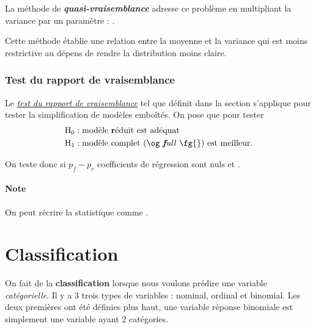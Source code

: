 \documentclass[french]{article}
\begin{document}
\begin{multicols*}{2}
La méthode de \textbf{\textit{quasi-vraisemblance}} adresse ce problème en multipliant la variance par un paramètre  : . 

\bigskip

Cette méthode établie une relation entre la moyenne et la variance qui est moins restrictive au dépens de rendre la distribution moins claire.


\subsubsection{Test du rapport de vraisemblance}
Le \textit{\color{bleudefrance}\underline{\hyperlink{TRVDef}{\color{bleudefrance} test du rapport de vraisemblance}}} tel que définit dans la section \textit{\underline{}} s'applique pour tester la simplification de modèles emboîtés. On pose que  pour tester 
\begin{align*}
	\mathrm{H}_{0}	&:	\text{modèle \textbf{r}éduit est adéquat}	\\
	\mathrm{H}_{1}	&:	\text{modèle complet (\og \textit{\textbf{f}ull} \fg{}) est meilleur}.
\end{align*}

On teste donc si $p_{f} - p_{r}$ coefficients de régression sont nuls et . 

\paragraph{Note}	On peut récrire la statistique comme .



\newpage
\section{Classification}\label{sec:classification}
On fait de la \textbf{classification} lorsque nous voulons prédire une variable \textit{catégorielle}. Il y a 3 trois types de variables : nominal, ordinal et binomial. Les deux premières ont été définies plus haut, une variable réponse binomiale est simplement une variable ayant 2 catégories.


\end{multicols*}
\end{document}
